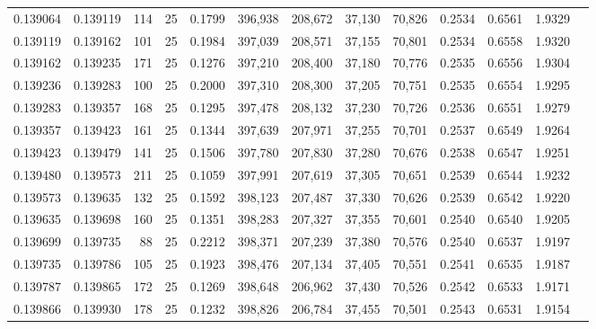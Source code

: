 \begin{tabular}{rrrrrrrrrrrrr}
0.139064 & 0.139119 &   114 &  25 &                                     0.1799 & 396,938 & 208,672 &  37,130 &  70,826 & 0.2534 & 0.6561 & 1.9329 \\
0.139119 & 0.139162 &   101 &  25 &                                     0.1984 & 397,039 & 208,571 &  37,155 &  70,801 & 0.2534 & 0.6558 & 1.9320 \\
0.139162 & 0.139235 &   171 &  25 &                                     0.1276 & 397,210 & 208,400 &  37,180 &  70,776 & 0.2535 & 0.6556 & 1.9304 \\
0.139236 & 0.139283 &   100 &  25 &                                     0.2000 & 397,310 & 208,300 &  37,205 &  70,751 & 0.2535 & 0.6554 & 1.9295 \\
0.139283 & 0.139357 &   168 &  25 &                                     0.1295 & 397,478 & 208,132 &  37,230 &  70,726 & 0.2536 & 0.6551 & 1.9279 \\
0.139357 & 0.139423 &   161 &  25 &                                     0.1344 & 397,639 & 207,971 &  37,255 &  70,701 & 0.2537 & 0.6549 & 1.9264 \\
0.139423 & 0.139479 &   141 &  25 &                                     0.1506 & 397,780 & 207,830 &  37,280 &  70,676 & 0.2538 & 0.6547 & 1.9251 \\
0.139480 & 0.139573 &   211 &  25 &                                     0.1059 & 397,991 & 207,619 &  37,305 &  70,651 & 0.2539 & 0.6544 & 1.9232 \\
0.139573 & 0.139635 &   132 &  25 &                                     0.1592 & 398,123 & 207,487 &  37,330 &  70,626 & 0.2539 & 0.6542 & 1.9220 \\
0.139635 & 0.139698 &   160 &  25 &                                     0.1351 & 398,283 & 207,327 &  37,355 &  70,601 & 0.2540 & 0.6540 & 1.9205 \\
0.139699 & 0.139735 &    88 &  25 &                                     0.2212 & 398,371 & 207,239 &  37,380 &  70,576 & 0.2540 & 0.6537 & 1.9197 \\
0.139735 & 0.139786 &   105 &  25 &                                     0.1923 & 398,476 & 207,134 &  37,405 &  70,551 & 0.2541 & 0.6535 & 1.9187 \\
0.139787 & 0.139865 &   172 &  25 &                                     0.1269 & 398,648 & 206,962 &  37,430 &  70,526 & 0.2542 & 0.6533 & 1.9171 \\
0.139866 & 0.139930 &   178 &  25 &                                     0.1232 & 398,826 & 206,784 &  37,455 &  70,501 & 0.2543 & 0.6531 & 1.9154 \\

\end{tabular}
